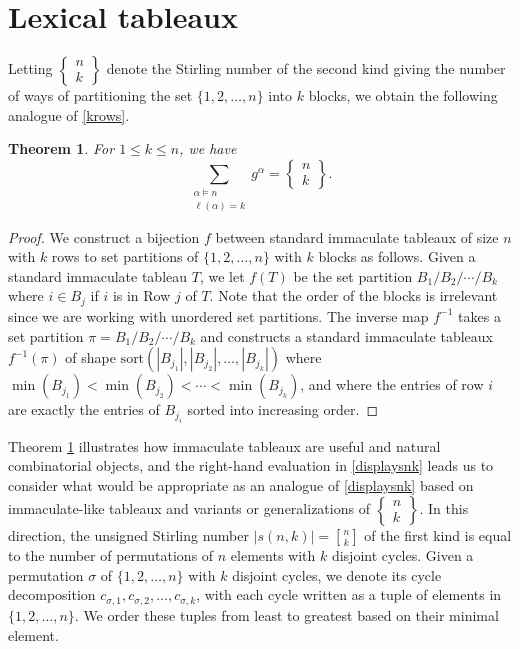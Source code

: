 \documentclass{amsart}
\newtheorem{theorem}{Theorem}[section]
\theoremstyle{definition}
\begin{document}
\section{Lexical tableaux}\label{sectionLexical}
 Letting $ \left\{ \begin{smallmatrix} n \\ k \end{smallmatrix} \right\} $ denote the Stirling number of the second kind 
 giving the number of ways of partitioning the set $\{ 1, 2, \ldots, n \}$ into $k$ blocks, we obtain the following analogue of \eqref{krows}. 

\begin{theorem}\label{thm:snk}
 For $1 \leq k \leq n$, we have 
\begin{equation}\label{displaysnk}
 \sum_{\substack{\alpha \vDash n\\ \ell(\alpha) = k}} g^{\alpha} = 
 \left\{ \begin{matrix} 
 n \\ k 
 \end{matrix} \right\}. 
\end{equation} 
\end{theorem}

\begin{proof} 
 We construct a bijection $f$ between standard immaculate tableaux of size $n$ with $k$ rows to set partitions of $\{ 1, 2, \ldots, 
 n \}$ with $k$ blocks as follows. Given a standard immaculate tableau $T$, we let $f(T)$ be the set partition $B_1 / B_2 / \cdots / 
 B_k$ where $i \in B_j$ if $i$ is in Row $j$ of $T$. Note that the order of the blocks is irrelevant since we are working with unordered set 
 partitions. The inverse map $f^{-1}$ takes a set partition $\pi = B_1 / B_2 / \cdots / B_k$ and constructs a standard immaculate 
 tableaux $f^{-1}(\pi)$ of shape $\text{sort}(|B_{j_1}|, |B_{j_2}|, \ldots, |B_{j_k}|)$ where $\min(B_{j_1}) < \min(B_{j_2}) < \cdots < 
 \min(B_{j_k})$, and where the entries of row $i$ are exactly the entries of $B_{j_i}$ sorted into increasing order. 
\end{proof}

 Theorem \ref{thm:snk} illustrates how immaculate tableaux are useful and natural combinatorial objects, and the
 right-hand evaluation in \eqref{displaysnk} leads us to consider what would be appropriate as an analogue of 
 \eqref{displaysnk} based on immaculate-like tableaux and variants or generalizations of $ \left\{ \begin{smallmatrix} 
 n \\ k \end{smallmatrix} \right\}$. In this direction, the unsigned Stirling number $|s(n,k)|= {n \brack k}$ of the first kind is equal to the number of permutations of $n$ elements with $k$ disjoint cycles. Given a permutation $\sigma$ of $\{1,2,\ldots, n\}$ with $k$ disjoint cycles, we denote its cycle decomposition $c_{\sigma, 1}, c_{\sigma, 2}, \ldots, c_{\sigma, k}$, with each cycle written as a tuple of elements in $\{1,2,\ldots, n\}$. We order these tuples from least to greatest based on their minimal element.
\end{document}
